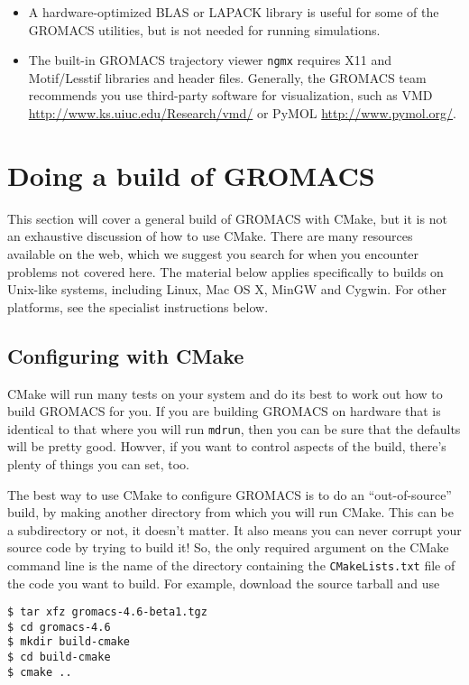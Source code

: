 \documentclass{article}[12pt,a4paper,twoside]
\newcommand{\gromacs}{GROMACS}
\newcommand{\cmake}{CMake}
\newcommand{\blas}{BLAS}
\newcommand{\lapack}{LAPACK}
\newcommand{\vmd}{VMD}
\newcommand{\pymol}{PyMOL}
\begin{document}
\begin{itemize}
\item A hardware-optimized \blas{} or \lapack{} library is useful for
  some of the \gromacs{} utilities, but is not needed for running
  simulations.
\item The built-in \gromacs{} trajectory viewer \texttt{ngmx} requires
  X11 and Motif/Lesstif libraries and header files. Generally, the
  \gromacs{} team recommends you use third-party software for
  visualization, such as \vmd{}
  \url{http://www.ks.uiuc.edu/Research/vmd/} or \pymol{}
  \url{http://www.pymol.org/}.
\end{itemize}

\section{Doing a build of \gromacs}

This section will cover a general build of \gromacs{} with \cmake{},
but it is not an exhaustive discussion of how to use \cmake{}. There
are many resources available on the web, which we suggest you search
for when you encounter problems not covered here. The material below
applies specifically to builds on Unix-like systems, including Linux,
Mac OS X, MinGW and Cygwin. For other platforms, see the specialist
instructions below.

\subsection{Configuring with \cmake{}}

\cmake{} will run many tests on your system and do its best to work
out how to build \gromacs{} for you. If you are building \gromacs{} on
hardware that is identical to that where you will run \texttt{mdrun},
then you can be sure that the defaults will be pretty good. Howver, if
you want to control aspects of the build, there's plenty of things you
can set, too.

The best way to use \cmake{} to configure \gromacs{} is to do an
``out-of-source'' build, by making another directory from which you
will run \cmake{}. This can be a subdirectory or not, it doesn't
matter. It also means you can never corrupt your source code by trying
to build it! So, the only required argument on the \cmake{} command
line is the name of the directory containing the
\texttt{CMakeLists.txt} file of the code you want to build. For
example, download the source tarball and use
\begin{verbatim}
$ tar xfz gromacs-4.6-beta1.tgz
$ cd gromacs-4.6
$ mkdir build-cmake
$ cd build-cmake
$ cmake ..
\end{verbatim}
\end{document}
